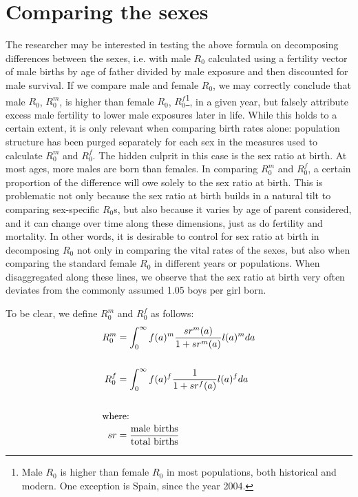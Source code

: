 \documentclass{article}
\begin{document}
\section*{Comparing the sexes}
The researcher may be interested in testing the above formula on decomposing differences between the sexes, i.e. with male $R_{0}$ calculated using a fertility vector of male births by age of father divided by male exposure and then discounted for male survival. If we compare male and female $R_{0}$, we may correctly conclude that male $R_{0}$, $R_{0}^{m}$, is higher than female $R_{0}$, $R_{0}^{f}$\footnote{Male $R_{0}$ is higher than female $R_{0}$ in most populations, both historical and modern. One exception is Spain, since the year 2004.}, in a given year, but falsely attribute excess male fertility to lower male exposures later in life. While this holds to a certain extent, it is only relevant when comparing birth rates alone: population structure has been purged separately for each sex in the measures used to calculate $R_{0}^{m}$ and $R_{0}^{f}$. The hidden culprit in this case is the sex ratio at birth. At most ages, more males are born than females. In comparing $R_{0}^{m}$ and $R_{0}^{f}$, a certain proportion of the difference will owe solely to the sex ratio at birth. This is problematic not only because the sex ratio at birth builds in a natural tilt to comparing sex-specific $R_{0}$s, but also because it varies by age of parent considered, and it can change over time along these dimensions, just as do fertility and mortality. In other words, it is desirable to control for sex ratio at birth in decomposing $R_{0}$ not only in comparing the vital rates of the sexes, but also when comparing the standard female $R_{0}$ in different years or populations. When disaggregated along these lines, we observe that the sex ratio at birth very often deviates from the commonly assumed 1.05 boys per girl born. 

To be clear, we define $R_{0}^{m}$ and $R_{0}^{f}$ as follows:
\begin{align}
R_{0}^{m} &= \int _{0}^{\infty} f(a)^{m}\frac{sr^{m}(a)}{1+sr^{m}(a)}l(a)^{m}da \notag \\ \notag \\
R_{0}^{f} &= \int _{0}^{\infty} f(a)^{f}\frac{1}{1+sr^{f}(a)}l(a)^{f}da \notag \\ \notag \\
\intertext{where:}
sr &= \frac{\text{male births}}{\text{total births}} \notag
\end{align}
\end{document}
